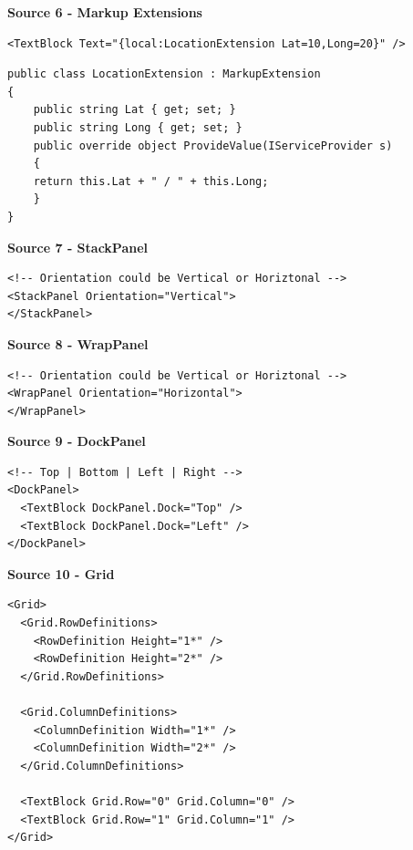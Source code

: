 \documentclass[10pt,twoside,landscape]{article}
\begin{document}
\begin{multicols}{2}
\textbf{Source 6 - Markup Extensions}
\lstset{language=XML,label= ,caption= ,captionpos=b,numbers=none}
\begin{lstlisting}
<TextBlock Text="{local:LocationExtension Lat=10,Long=20}" />
\end{lstlisting}

\lstset{language=csharp,label= ,caption= ,captionpos=b,numbers=none}
\begin{lstlisting}
public class LocationExtension : MarkupExtension
{
    public string Lat { get; set; }
    public string Long { get; set; }
    public override object ProvideValue(IServiceProvider s)
    {
	return this.Lat + " / " + this.Long;
    }
}
\end{lstlisting}


\textbf{Source 7 - StackPanel}
\lstset{language=XML,label= ,caption= ,captionpos=b,numbers=none}
\begin{lstlisting}
<!-- Orientation could be Vertical or Horiztonal -->
<StackPanel Orientation="Vertical">
</StackPanel>
\end{lstlisting}

\textbf{Source 8 - WrapPanel}
\lstset{language=XML,label= ,caption= ,captionpos=b,numbers=none}
\begin{lstlisting}
<!-- Orientation could be Vertical or Horiztonal -->
<WrapPanel Orientation="Horizontal">
</WrapPanel>
\end{lstlisting}

\textbf{Source 9 - DockPanel}
\lstset{language=XML,label= ,caption= ,captionpos=b,numbers=none}
\begin{lstlisting}
<!-- Top | Bottom | Left | Right -->
<DockPanel>
  <TextBlock DockPanel.Dock="Top" />
  <TextBlock DockPanel.Dock="Left" />
</DockPanel>
\end{lstlisting}

\textbf{Source 10 - Grid}
\lstset{language=XML,label= ,caption= ,captionpos=b,numbers=none}
\begin{lstlisting}
<Grid>
  <Grid.RowDefinitions>
    <RowDefinition Height="1*" />
    <RowDefinition Height="2*" />
  </Grid.RowDefinitions>

  <Grid.ColumnDefinitions>
    <ColumnDefinition Width="1*" />
    <ColumnDefinition Width="2*" />
  </Grid.ColumnDefinitions>

  <TextBlock Grid.Row="0" Grid.Column="0" />
  <TextBlock Grid.Row="1" Grid.Column="1" />
</Grid>
\end{lstlisting}


\end{multicols}
\end{document}
